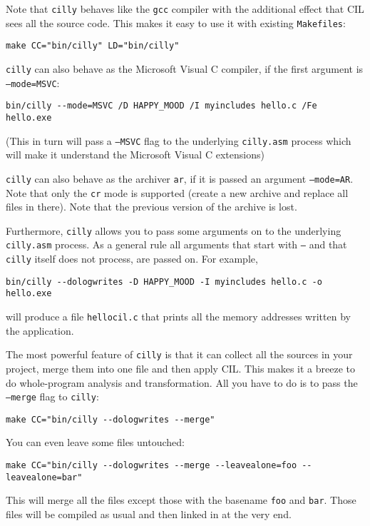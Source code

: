 \documentclass{article}
\def\t#1{{\tt #1}}
\begin{document}
 Note that \t{cilly} behaves like the \t{gcc} compiler with the additional
effect that CIL sees all the source code. This makes it easy
to use it with existing \t{Makefiles}:
\begin{verbatim}
make CC="bin/cilly" LD="bin/cilly"
\end{verbatim}

 \t{cilly} can also behave as the Microsoft Visual C compiler, if the first
 argument is \t{--mode=MSVC}:
\begin{verbatim}
bin/cilly --mode=MSVC /D HAPPY_MOOD /I myincludes hello.c /Fe hello.exe
\end{verbatim}

 (This in turn will pass a \t{--MSVC} flag to the underlying \t{cilly.asm}
 process which will make it understand the Microsoft Visual C extensions)

 \t{cilly} can also behave as the archiver \t{ar}, if it is passed an
argument \t{--mode=AR}. Note that only the \t{cr} mode is supported (create a
new archive and replace all files in there). Note that the previous version of
the archive is lost. 

 Furthermore, \t{cilly} allows you to pass some arguments on to the
underlying \t{cilly.asm} process. As a general rule all arguments that start
with \t{--} and that \t{cilly} itself does not process, are passed on. For
example, 
\begin{verbatim}
bin/cilly --dologwrites -D HAPPY_MOOD -I myincludes hello.c -o hello.exe
\end{verbatim}

 will produce a file \t{hellocil.c} that prints all the memory addresses
written by the application. 

 The most powerful feature of \t{cilly} is that it can collect all the
sources in your project, merge them into one file and then apply CIL. This
makes it a breeze to do whole-program analysis and transformation. All you
have to do is to pass the \t{--merge} flag to \t{cilly}:
\begin{verbatim}
make CC="bin/cilly --dologwrites --merge"
\end{verbatim}

 You can even leave some files untouched:
\begin{verbatim}
make CC="bin/cilly --dologwrites --merge --leavealone=foo --leavealone=bar"
\end{verbatim}

 This will merge all the files except those with the basename \t{foo} and
\t{bar}. Those files will be compiled as usual and then linked in at the very
end. 
\end{document}
